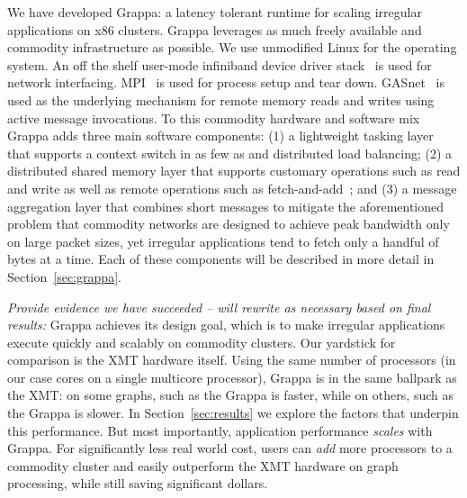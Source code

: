 We have developed Grappa:  a latency tolerant runtime for scaling irregular applications on x86 clusters.  Grappa leverages as much freely available and commodity infrastructure as possible. We use unmodified Linux for the operating system.  An off the shelf user-mode infiniband device driver stack~\cite{Melonox?} is used for network interfacing.  MPI~\cite{mpi} is used for process setup and tear down.  GASnet~\cite{gasnet} is used as the underlying mechanism for remote memory reads and writes using active message invocations. To this commodity hardware and software mix Grappa adds three main software components: (1) a lightweight tasking layer that supports a context switch in as few as  and distributed load balancing; (2) a distributed shared memory layer that supports customary operations such as read and write as well as remote operations such as fetch-and-add~\cite{fetchandadd}; and (3) a message aggregation layer that combines short messages to mitigate the aforementioned problem that commodity networks are designed to achieve peak bandwidth only on large packet sizes, yet irregular applications tend to fetch only a handful of bytes at a time.  Each of these components will be described in more detail in Section~\ref{sec:grappa}.

{\em Provide evidence we have succeeded -- will rewrite as necessary based on final results:}
Grappa achieves its design goal, which is to make irregular applications execute quickly and scalably on commodity clusters.  Our yardstick for comparison is the XMT hardware itself.  Using the same number of processors (in our case cores on a single multicore processor), Grappa is in the same ballpark as the XMT: on some graphs, such as the  Grappa is  faster, while on others, such as the  Grappa is  slower.  In Section~\ref{sec:results} we explore the factors that underpin this performance.  But most importantly, application performance \emph{scales} with Grappa.  For significantly less real world cost, users can \emph{add} more processors to a commodity cluster and easily outperform the XMT hardware on graph processing, while still saving significant dollars.





